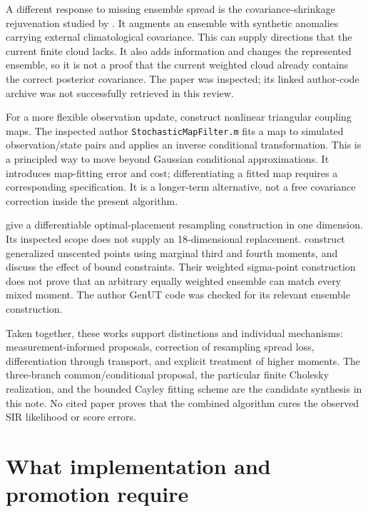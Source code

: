 A different response to missing ensemble spread is the covariance-shrinkage
rejuvenation studied by \citet[Sections 4--6]{popov2022rejuvenation}. It augments an
ensemble with synthetic anomalies carrying external climatological covariance.
This can supply directions that the current finite cloud lacks. It also adds
information and changes the represented ensemble, so it is not a proof that
the current weighted cloud already contains the correct posterior covariance.
The paper was inspected; its linked author-code archive was not successfully
retrieved in this review.

For a more flexible observation update, \citet[Sections 3.3, 3.7 and
Appendix A]{spantini2022coupling} construct nonlinear triangular coupling maps.
The inspected author \texttt{StochasticMapFilter.m} fits a map to simulated
observation/state pairs and applies an inverse conditional transformation.
This is a principled way to move beyond Gaussian conditional approximations.
It introduces map-fitting error and cost; differentiating a fitted map
requires a corresponding specification. It is a longer-term alternative,
not a free covariance correction inside the present algorithm.

\citet[Sections III--V]{csuzdi2024optimalplacement} give a differentiable
optimal-placement resampling construction in one dimension.
Its inspected scope does not supply an 18-dimensional replacement.
\citet[Sections IV--V]{ebeigbe2025genut} construct generalized unscented points
using marginal third and fourth moments, and discuss the effect of bound
constraints. Their weighted sigma-point construction does not prove that
an arbitrary equally weighted ensemble can match every mixed moment.
The author GenUT code was checked for its relevant ensemble construction.

Taken together, these works support distinctions and individual mechanisms:
measurement-informed proposals, correction of resampling spread loss,
differentiation through transport, and explicit treatment of higher moments.
The three-branch common/conditional proposal, the particular finite
Cholesky realization, and the bounded Cayley fitting scheme are the
candidate synthesis in this note. No cited paper proves that the combined
algorithm cures the observed SIR likelihood or score errors.

\section[Implementation and promotion checks]{What implementation and promotion require}

